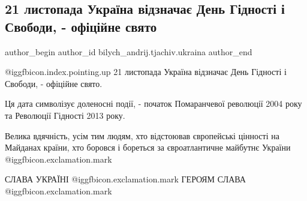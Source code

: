  
 
 
 
 
 
\subsection{21 листопада Україна відзначає День Гідності і Свободи, - офіційне свято}
\label{sec:21_11_2021.fb.bilych_andrij.tjachiv.ukraina.2.maidan}
 
\ifcmt
 author_begin
   author_id bilych_andrij.tjachiv.ukraina
 author_end
\fi

@igg{fbicon.index.pointing.up} 21 листопада Україна відзначає День Гідності і Свободи, - офіційне свято. 

Ця дата символізує доленосні події, - початок Помаранчевої революції 2004 року
та  Революції Гідності 2013 року.


Велика вдячність,  усім тим людям, хто відстоював європейські цінності  на
Майданах країни, хто боровся і бореться за євроатлантичне майбутнє України  @igg{fbicon.exclamation.mark}

СЛАВА УКРАЇНІ @igg{fbicon.exclamation.mark} ГЕРОЯМ СЛАВА @igg{fbicon.exclamation.mark}



